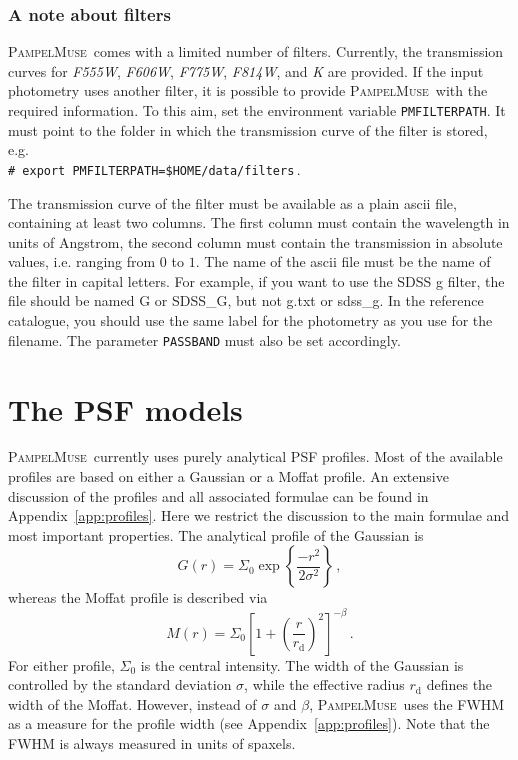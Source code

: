\documentclass[a4paper,10pt]{article}
\newcommand{\shellcmd}[1]{\\\indent\indent\texttt{\footnotesize\# #1}}
\newcommand{\pampelmuse}{\textsc{PampelMuse}\ }
\newcommand{\rd}{r_\text{d}}
\begin{document}
\subsubsection{A note about filters}
\pampelmuse comes with a limited number of filters. Currently, the transmission curves for \textit{F555W}, \textit{F606W}, \textit{F775W}, \textit{F814W}, and \textit{K} are provided. If the input photometry uses another filter, it is possible to provide \pampelmuse with the required information. To this aim, set the environment variable \texttt{PMFILTERPATH}. It must point to the folder in which the transmission curve of the filter is stored, e.g.
\shellcmd{export PMFILTERPATH=\$HOME/data/filters}\,.

The transmission curve of the filter must be available as a plain ascii file, containing at least two columns. The first column must contain the wavelength in units of Angstrom, the second column must contain the transmission in absolute values, i.e. ranging from $0$ to $1$. The name of the ascii file must be the name of the filter in capital letters. For example, if you want to use the SDSS g filter, the file should be named G or SDSS\_G, but not g.txt or sdss\_g. In the reference catalogue, you should use the same label for the photometry as you use for the filename. The parameter \texttt{PASSBAND} must also be set accordingly.

\section{The PSF models}
\label{sec:psf}

\pampelmuse currently uses purely analytical PSF profiles. Most of the available profiles are based on either a Gaussian or a Moffat profile. An extensive discussion of the profiles and all associated formulae can be found in Appendix~\ref{app:profiles}. Here we restrict the discussion to the main formulae and most important properties. The analytical profile of the Gaussian is 
%
\begin{equation}
 G(r) = \Sigma_\text{0}\exp\left\{\frac{-r^2}{2\sigma^2}\right\}\,,
\end{equation}
%
whereas the Moffat profile is described via
%
\begin{equation}
 M(r) = \Sigma_\text{0}\left[1+\left(\frac{r}{\rd}\right)^2\right]^{-\beta}\,.
\end{equation}
%
For either profile, $\Sigma_\mathrm{0}$ is the central intensity. The width of the Gaussian is controlled by the standard deviation $\sigma$, while the effective radius $\rd$ defines the width of the Moffat. However, instead of $\sigma$ and $\beta$, \pampelmuse uses the FWHM as a measure for the profile width (see Appendix~\ref{app:profiles}). Note that the FWHM is always measured in units of spaxels.
\end{document}
